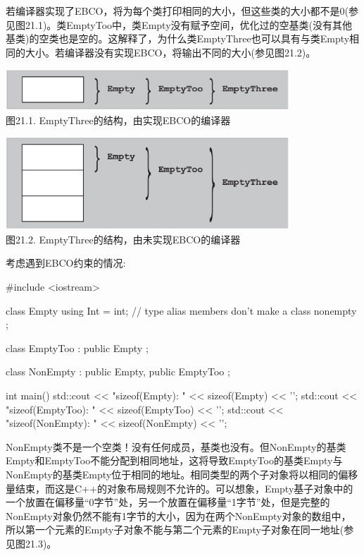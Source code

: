若编译器实现了EBCO，将为每个类打印相同的大小，但这些类的大小都不是0(参见图21.1)。类EmptyToo中，类Empty没有赋予空间，优化过的空基类(没有其他基类)的空类也是空的。这解释了，为什么类EmptyThree也可以具有与类Empty相同的大小。若编译器没有实现EBCO，将输出不同的大小(参见图21.2)。

\begin{center}
\includegraphics[width=0.8\textwidth]{part3/ch21/images/1.png} \\
图21.1. EmptyThree的结构，由实现EBCO的编译器
\end{center}

\begin{center}
\includegraphics[width=0.8\textwidth]{part3/ch21/images/2.png} \\
图21.2. EmptyThree的结构，由未实现EBCO的编译器
\end{center}

考虑遇到EBCO约束的情况:

\begin{cpp}
#include <iostream>

class Empty {
	using Int = int; // type alias members don’t make a class nonempty
};

class EmptyToo : public Empty {
};

class NonEmpty : public Empty, public EmptyToo {
};

int main()
{
	std::cout << "sizeof(Empty): " << sizeof(Empty) << ’\n’;
	std::cout << "sizeof(EmptyToo): " << sizeof(EmptyToo) << ’\n’;
	std::cout << "sizeof(NonEmpty): " << sizeof(NonEmpty) << ’\n’;
}
\end{cpp}

NonEmpty类不是一个空类！没有任何成员，基类也没有。但NonEmpty的基类Empty和EmptyToo不能分配到相同地址，这将导致EmptyToo的基类Empty与NonEmpty的基类Empty位于相同的地址。相同类型的两个子对象将以相同的偏移量结束，而这是C++的对象布局规则不允许的。可以想象，Empty基子对象中的一个放置在偏移量“0字节”处，另一个放置在偏移量“1字节”处，但是完整的NonEmpty对象仍然不能有1字节的大小，因为在两个NonEmpty对象的数组中，所以第一个元素的Empty子对象不能与第二个元素的Empty子对象在同一地址(参见图21.3)。

